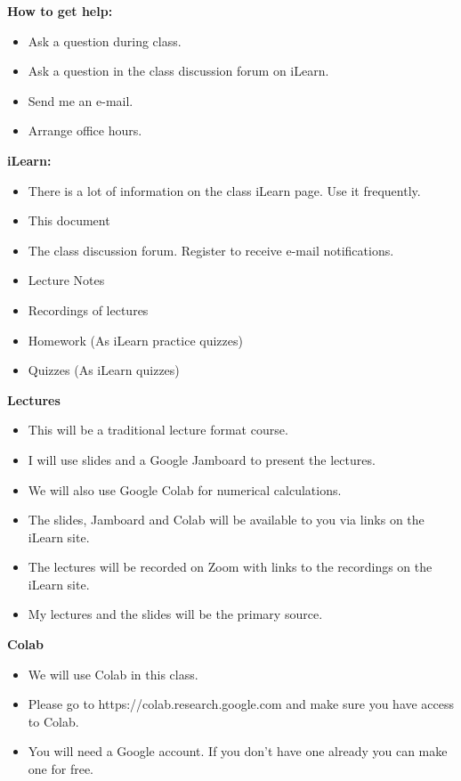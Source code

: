 \documentclass[oneside,12pt]{amsart}
\begin{document}
\textbf{How to get help:}
\begin{itemize}
\item Ask a question during class.
\item Ask a question in the class discussion forum on iLearn.
\item Send me an e-mail.
\item Arrange office hours.
\end{itemize}

\bigskip

\textbf{iLearn:}
\begin{itemize}
\item There is a lot of information on the class iLearn page. Use it frequently.
\item This document
\item The class discussion forum. Register to receive e-mail notifications.
\item Lecture Notes
\item Recordings of lectures
\item Homework (As iLearn practice quizzes)
\item Quizzes (As iLearn quizzes)
\end{itemize}

\bigskip

\textbf{Lectures}
\begin{itemize}
\item This will be a traditional lecture format course.
\item I will use slides and a Google Jamboard to present the lectures.
\item We will also use Google Colab for numerical calculations.
\item The slides, Jamboard and Colab will be available to you via links on the iLearn site.
\item The lectures will be recorded on Zoom with links to the recordings on the iLearn site.
\item My lectures and the slides will be the primary source.
\end{itemize}

\bigskip

\textbf{Colab}
\begin{itemize}
\item We will use Colab in this class.
\item Please go to https://colab.research.google.com and make sure you have access to Colab.
\item You will need a Google account. If you don't have one already you can make one for free.
\end{itemize}
\end{document}
